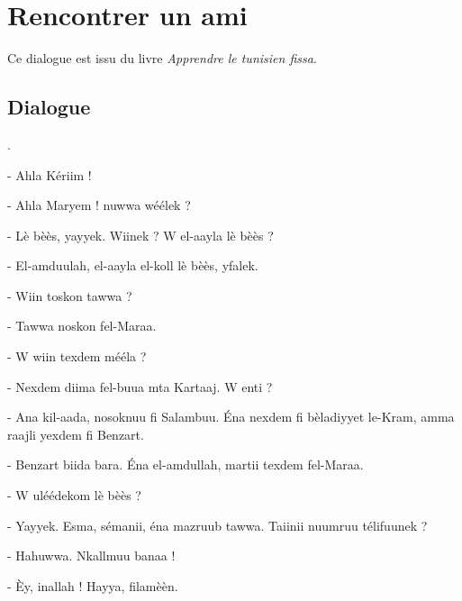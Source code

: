 \chapter{Rencontrer un ami}

Ce dialogue est issu du livre \textit{Apprendre le tunisien fissa}.

\section{Dialogue}
.\newline

- Ahla Kériim !

- Ahla Maryem ! \VS nuwwa \hb wéélek ? 

- Lè bèès, y\ca ayy\vs ek. Wiinek ? W el-\ca aayla lè bèès ?

- El-\hb amduulah, el-\ca aayla el-koll lè bèès, yfa\cdh \cdh lek.

- Wiin toskon tawwa ?

- Tawwa noskon fel-Mar\cs aa.

- W wiin texdem mééla ? 

- Nexdem diima fel-buu\cs \ct a mta\ca{} Kartaaj. W enti ? 

- A\hb na kil-\ca aada, nosoknuu fi Salambuu. Éna nexdem fi bèladiyyet le-Kram, amma raajli yexdem fi Benzart.

- Benzart b\ca iida bar\vs a. Éna el-\hb amdullah, martii texdem fel-Mar\cs aa.

- W uléédekom lè bèès ? 

- Y\ca ayy\vs ek. Esma\ca, séma\hb nii, éna mazruub tawwa. Ta\ca\ct iinii nuumruu télifuunek ? 

- Hahuwwa. Nkallmuu b\ca a\cdh naa ! 

- Èy, in\vs allah ! Hayya, filamèèn.